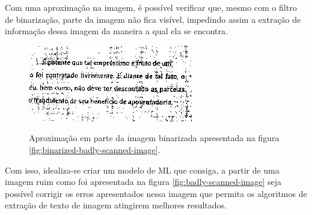 Com uma aproximação na imagem, é possível verificar que, mesmo com o filtro de binarização, parte da imagem não fica visível, impedindo assim a extração de informação dessa imagem da maneira a qual ela se encontra.

\begin{figure}[H]
    \centering
    \caption{Aproximação em parte da imagem binarizada apresentada na figura \ref{fig:binarized-badly-scanned-image}.}
    \includegraphics[scale=1]{figuras/zoom-in-binarized-image.png}
    \label{fig:zoom-in-binarized-image}
\end{figure}

Com isso, idealiza-se criar um modelo de ML que consiga, a partir de uma imagem ruim como foi apresentada na figura \ref{fig:badly-scanned-image} seja possível corrigir os erros apresentados nessa imagem que permita os algoritmos de extração de texto de imagem atingirem melhores resultados.